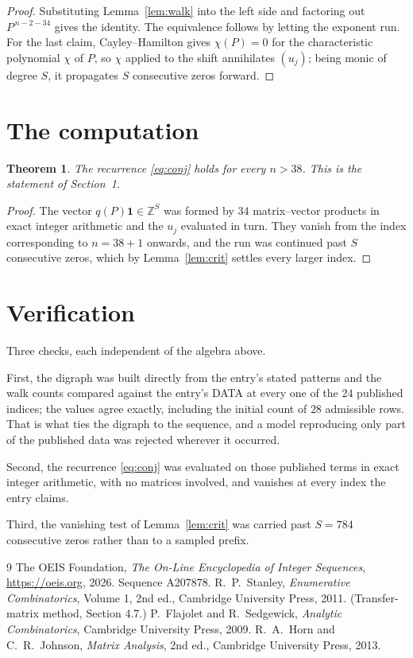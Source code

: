 \documentclass[11pt,a4paper]{article}
\theoremstyle{plain}
\newtheorem{theorem}{Theorem}
\theoremstyle{definition}
\begin{document}
\begin{proof}
Substituting Lemma~\ref{lem:walk} into the left side and factoring out
$P^{\,n-2-34}$ gives the identity. The equivalence follows by letting the exponent
run. For the last claim, Cayley--Hamilton gives $\chi(P)=0$ for the characteristic
polynomial $\chi$ of $P$, so $\chi$ applied to the shift annihilates $(u_j)$; being monic of
degree $S$, it propagates $S$ consecutive zeros forward.
\end{proof}

\section{The computation}

\begin{theorem}
The recurrence \eqref{eq:conj} holds for every $n>38$. This is the statement of
Section~1.
\end{theorem}

\begin{proof}
The vector $q(P)\mathbf{1}\in\mathbb{Z}^{S}$ was formed by $34$ matrix--vector
products in exact integer arithmetic and the $u_j$ evaluated in turn. They vanish from the
index corresponding to $n=38+1$ onwards, and the run was continued past $S$ consecutive
zeros, which by Lemma~\ref{lem:crit} settles every larger index.
\end{proof}

\section{Verification}

Three checks, each independent of the algebra above.

First, the digraph was built directly from the entry's stated patterns and the walk counts
compared against the entry's DATA at every one of the $24$ published indices; the
values agree exactly, including the initial count of $28$ admissible rows. That is
what ties the digraph to the sequence, and a model reproducing only part of the published
data was rejected wherever it occurred.

Second, the recurrence \eqref{eq:conj} was evaluated on those published terms in exact
integer arithmetic, with no matrices involved, and vanishes at every index the entry claims.

Third, the vanishing test of Lemma~\ref{lem:crit} was carried past $S=784$ consecutive
zeros rather than to a sampled prefix.

\begin{thebibliography}{9}
 The OEIS Foundation, \emph{The On-Line Encyclopedia of Integer
Sequences}, \url{https://oeis.org}, 2026. Sequence A207878.
 R.~P.~Stanley, \emph{Enumerative Combinatorics}, Volume 1, 2nd ed.,
Cambridge University Press, 2011. (Transfer-matrix method, Section 4.7.)
 P.~Flajolet and R.~Sedgewick, \emph{Analytic Combinatorics}, Cambridge
University Press, 2009.
 R.~A.~Horn and C.~R.~Johnson, \emph{Matrix Analysis}, 2nd ed., Cambridge
University Press, 2013.
\end{thebibliography}
\end{document}
